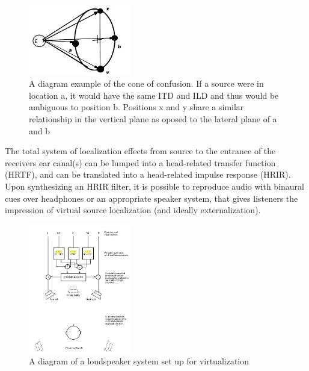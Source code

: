 \documentclass[paper=a4, fontsize=10pt, font=arial]{scrartcl} %
\numberwithin{equation}{section} %
\numberwithin{figure}{section} %
\numberwithin{table}{section} %
\begin{document}
\begin{figure}[H]
\centering
\includegraphics[width=0.4\textwidth]{coneofconfusion.jpg}
\centering
\caption{A diagram example of the cone of confusion. If a source were in location a, it would have the same ITD and ILD and thus would be ambiguous to position b. Positions x and y share a similar relationship in the vertical plane as oposed to the lateral plane of a and b~\cite{Begault1995}}
\end{figure}

The total system of localization effects from source to the entrance of the receivers ear canal(s) can be lumped into a head-related transfer function (HRTF), and can be translated into a head-related impulse response (HRIR). Upon synthesizing an HRIR filter, it is possible to reproduce audio with binaural cues over headphones or an appropriate speaker system, that gives listeners the impression of virtual source localization (and ideally externalization). 

\begin{figure}[H]
\centering
\includegraphics[width=0.4\textwidth]{virtualizationoverspeakers.JPG}
\centering
\caption{A diagram of a loudspeaker system set up for virtualization~\cite{rumsey2012spatial}}
\end{figure}
\end{document}
